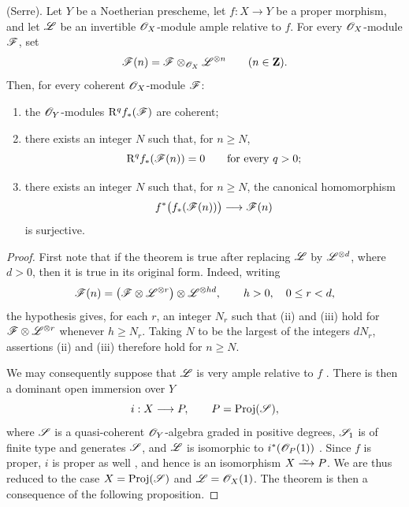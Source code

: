 \begin{theorem}[2.2.1]
\label{III.2.2.1}
(Serre).
Let $Y$ be a Noetherian prescheme, let $f:X\to Y$ be a proper morphism, and let $\mathscr{L}$ be an invertible $\mathscr{O}_X$-module ample relative to $f$.
For every $\mathscr{O}_X$-module $\mathscr{F}$, set
\[
  \mathscr{F}(n)=\mathscr{F}\otimes_{\mathscr{O}_X}\mathscr{L}^{\otimes n}
  \qquad(n\in\mathbf{Z}).
\]
Then, for every coherent $\mathscr{O}_X$-module $\mathscr{F}$:
\begin{enumerate}
  \item[{\rm(i)}] the $\mathscr{O}_Y$-modules $\mathrm{R}^qf_*(\mathscr{F})$ are coherent;
  \item[{\rm(ii)}] there exists an integer $N$ such that, for $n\geq N$,
  \[
    \mathrm{R}^qf_*(\mathscr{F}(n))=0
    \qquad\text{for every }q>0;
  \]
  \item[{\rm(iii)}] there exists an integer $N$ such that, for $n\geq N$, the canonical homomorphism
  \[
    f^*\bigl(f_*(\mathscr{F}(n))\bigr)\longrightarrow\mathscr{F}(n)
  \]
  is surjective.
\end{enumerate}
\end{theorem}

\begin{proof}
First note that if the theorem is true after replacing $\mathscr{L}$ by $\mathscr{L}^{\otimes d}$, where $d>0$, then it is true in its original form.
Indeed, writing
\[
  \mathscr{F}(n)
  =\bigl(\mathscr{F}\otimes\mathscr{L}^{\otimes r}\bigr)
   \otimes\mathscr{L}^{\otimes hd},
   \qquad h>0,\quad 0\leq r<d,
\]
the hypothesis gives, for each $r$, an integer $N_r$ such that (ii) and (iii) hold for $\mathscr{F}\otimes\mathscr{L}^{\otimes r}$ whenever $h\geq N_r$.
Taking $N$ to be the largest of the integers $dN_r$, assertions (ii) and (iii) therefore hold for $n\geq N$.

We may consequently suppose that $\mathscr{L}$ is very ample relative to $f$ .
There is then a dominant open immersion over $Y$
\[
  i:X\longrightarrow P,
  \qquad P=\operatorname{Proj}(\mathscr{S}),
\]
where $\mathscr{S}$ is a quasi-coherent $\mathscr{O}_Y$-algebra graded in positive degrees, $\mathscr{S}_1$ is of finite type and generates $\mathscr{S}$, and $\mathscr{L}$ is isomorphic to $i^*(\mathscr{O}_P(1))$ .
Since $f$ is proper, $i$ is proper as well , and hence is an isomorphism $X\simto P$.
We are thus reduced to the case $X=\operatorname{Proj}(\mathscr{S})$ and $\mathscr{L}=\mathscr{O}_X(1)$.
The theorem is then a consequence of the following proposition.
\end{proof}

